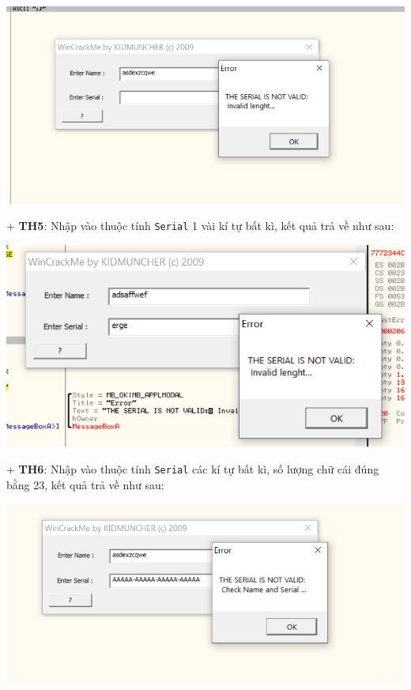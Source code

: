 \begin{center}
    \includegraphics[width=\textwidth]{img/file-2/demo6.PNG}
\end{center}
+ \textbf{TH5}: Nhập vào thuộc tính \texttt{Serial} 1 vài kí tự bất kì, kết quả trả về như sau:
\begin{center}
    \includegraphics[width=\textwidth]{img/file-2/demo9.PNG}
\end{center}
+ \textbf{TH6}: Nhập vào thuộc tính \texttt{Serial} các kí tự bất kì, số lượng chữ cái đúng bằng 23, kết quả trả về như sau:
\begin{center}
    \includegraphics[width=\textwidth]{img/file-2/demo7.PNG}
\end{center}
